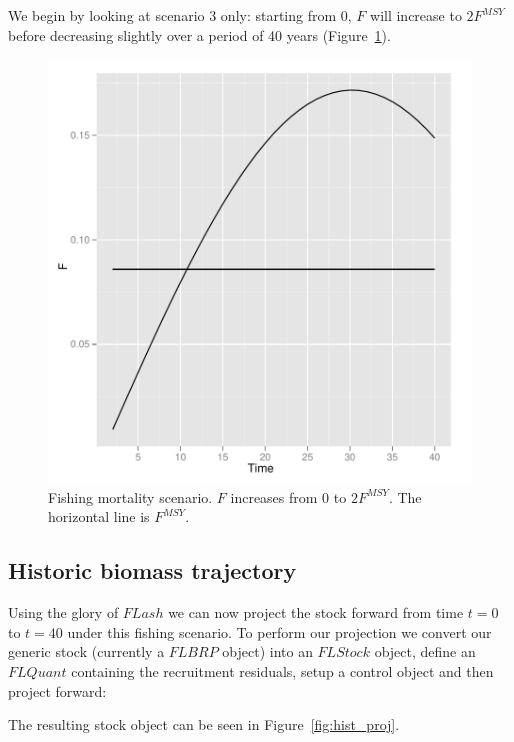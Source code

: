 \documentclass[a4paper]{article}
\begin{document}
We begin by looking at scenario 3 only: starting from 0, $F$ will increase to $2F^{MSY}$
before decreasing slightly over a period of 40 years (Figure~\ref{fig:Fscenario}). 

\begin{figure}
\centering
\includegraphics{script-F_plot1}
\caption{Fishing mortality scenario. $F$ increases from 0 to $2F^{MSY}$. The horizontal line is $F^{MSY}$.}
\label{fig:Fscenario}
\end{figure}

\subsection{Historic biomass trajectory}

Using the glory of $FLash$ we can now project the stock forward from time $t=0$ to $t=40$ under this fishing
scenario. To perform our projection we convert our generic stock (currently a $FLBRP$ object) into an $FLStock$ object,
define an $FLQuant$ containing the recruitment residuals, setup a control object and then project forward:


The resulting stock object can be seen in Figure~\ref{fig:hist_proj}.
\end{document}
